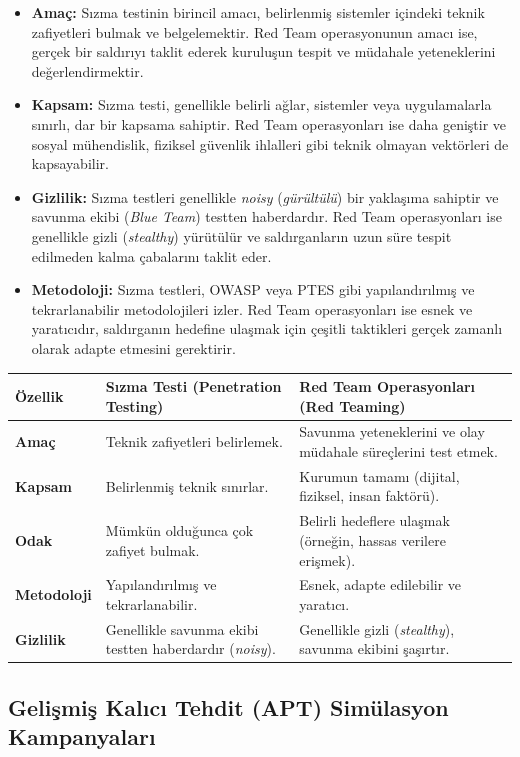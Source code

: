 \begin{itemize}
\item \textbf{Amaç:} Sızma testinin birincil amacı, belirlenmiş sistemler içindeki teknik zafiyetleri bulmak ve belgelemektir. Red Team operasyonunun amacı ise, gerçek bir saldırıyı taklit ederek kuruluşun tespit ve müdahale yeteneklerini değerlendirmektir.
\item \textbf{Kapsam:} Sızma testi, genellikle belirli ağlar, sistemler veya uygulamalarla sınırlı, dar bir kapsama sahiptir. Red Team operasyonları ise daha geniştir ve sosyal mühendislik, fiziksel güvenlik ihlalleri gibi teknik olmayan vektörleri de kapsayabilir.
\item \textbf{Gizlilik:} Sızma testleri genellikle \textit{noisy} (\textit{gürültülü}) bir yaklaşıma sahiptir ve savunma ekibi (\textit{Blue Team}) testten haberdardır. Red Team operasyonları ise genellikle gizli (\textit{stealthy}) yürütülür ve saldırganların uzun süre tespit edilmeden kalma çabalarını taklit eder.
\item \textbf{Metodoloji:} Sızma testleri, OWASP veya PTES gibi yapılandırılmış ve tekrarlanabilir metodolojileri izler. Red Team operasyonları ise esnek ve yaratıcıdır, saldırganın hedefine ulaşmak için çeşitli taktikleri gerçek zamanlı olarak adapte etmesini gerektirir.
\end{itemize}

\begin{tabular}{|l|l|l|}
\hline
\textbf{Özellik} & \textbf{Sızma Testi (Penetration Testing)} & \textbf{Red Team Operasyonları (Red Teaming)} \\
\hline
\textbf{Amaç} & Teknik zafiyetleri belirlemek. & Savunma yeteneklerini ve olay müdahale süreçlerini test etmek. \\
\hline
\textbf{Kapsam} & Belirlenmiş teknik sınırlar. & Kurumun tamamı (dijital, fiziksel, insan faktörü). \\
\hline
\textbf{Odak} & Mümkün olduğunca çok zafiyet bulmak. & Belirli hedeflere ulaşmak (örneğin, hassas verilere erişmek). \\
\hline
\textbf{Metodoloji} & Yapılandırılmış ve tekrarlanabilir. & Esnek, adapte edilebilir ve yaratıcı. \\
\hline
\textbf{Gizlilik} & Genellikle savunma ekibi testten haberdardır (\textit{noisy}). & Genellikle gizli (\textit{stealthy}), savunma ekibini şaşırtır. \\
\hline
\end{tabular}

\subsection{Gelişmiş Kalıcı Tehdit (APT) Simülasyon Kampanyaları}

